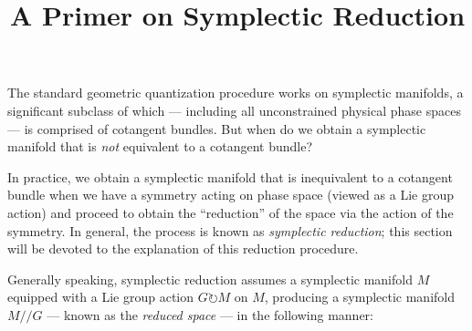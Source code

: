 \documentclass{tufte-handout}
\title{A Primer on Symplectic Reduction}
\begin{document}
The standard geometric quantization procedure works on symplectic manifolds, a significant subclass of which --- including all unconstrained physical phase spaces --- is comprised of cotangent bundles. But when do we obtain a symplectic manifold that is \emph{not} equivalent to a cotangent bundle?

In practice, we obtain a symplectic manifold that is inequivalent to a cotangent bundle when we have a symmetry acting on phase space (viewed as a Lie group action) and proceed to obtain the ``reduction'' of the space via the action of the symmetry. In general, the process is known as \emph{symplectic reduction}; this section will be devoted to the explanation of this reduction procedure.

Generally speaking, symplectic reduction assumes a symplectic manifold $M$ equipped with a Lie group action $G \circlearrowright M$ on $M$, producing a symplectic manifold $M // G$ --- known as the \emph{reduced space} --- in the following manner:
\end{document}
